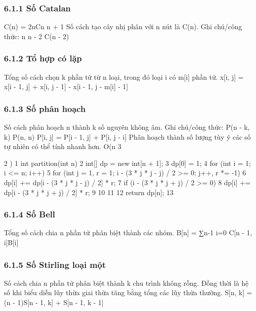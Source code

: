 \documentclass[11pt]{article}
\begin{document}
\subsubsection{6.1.1 Số Catalan}
\begin{NoteBlock}
C(n) =
2nCn
n + 1
Số cách tạo cây nhị phân với n nút là C(n).
Ghi chú/công thức: n   n - 2   C(n - 2)
\end{NoteBlock}
\subsubsection{6.1.2 Tổ hợp có lặp}
\begin{NoteBlock}
Tổng số cách chọn k phần tử từ n loại, trong đó loại i có m[i] phần tử.
x[i, j] = x[i - 1, j] + x[i, j - 1] - x[i - 1, j - m[i] - 1]
\end{NoteBlock}
\subsubsection{6.1.3 Số phân hoạch}
\begin{NoteBlock}
Số cách phân hoạch n thành k số nguyên không âm.
Ghi chú/công thức: P(n - k, k)  P(n, n)
P[i, j] = P[i - 1, j] + P[i, j - i]
Phân hoạch thành số lượng tùy ý các số tự nhiên có thể tính nhanh hơn.
O(n
3
\end{NoteBlock}
\begin{Code}
2 )
1 int partition(int n) {
2 int[] dp = new int[n + 1];
3 dp[0] = 1;
4 for (int i = 1; i <= n; i++) {
5 for (int j = 1, r = 1; i - (3 * j * j - j) / 2 >= 0; j++, r *= -1) {
6 dp[i] += dp[i - (3 * j * j - j) / 2] * r;
7 if (i - (3 * j * j + j) / 2 >= 0) {
8 dp[i] += dp[i - (3 * j * j + j) / 2] * r;
9 }
10 }
11 }
12 return dp[n];
13 }
\end{Code}
\subsubsection{6.1.4 Số Bell}
\begin{NoteBlock}
Tổng số cách chia n phần tử phân biệt thành các nhóm.
B[n] =
∑n-1
i=0 C[n - 1, i]B[i]
\end{NoteBlock}
\subsubsection{6.1.5 Số Stirling loại một}
\begin{NoteBlock}
Số cách chia n phần tử phân biệt thành k chu trình không rỗng.
Đồng thời là hệ số khi biểu diễn lũy thừa giai thừa tăng bằng tổng các lũy thừa thường.
S[n, k] = (n - 1)S[n - 1, k] + S[n - 1, k - 1]
\end{NoteBlock}
\end{document}
